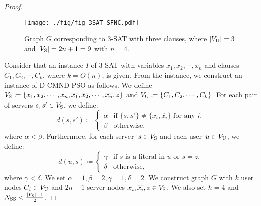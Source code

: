 \documentclass[10pt, letterpaper]{IEEEtran}
\begin{document}
\begin{CJK}{UTF8}{ipxm}
\begin{proof}
  \begin{figure}[!t]
    \begin{center}
      \texttt{[image: ./fig/fig\_3SAT\_SFNC.pdf]}
    \end{center}
    \caption{Graph $G$ corresponding to 3-SAT with three clauses, where $|V_{\rm U}|=3$ and $|V_{\rm S}|=2n+1=9$ with $n=4$.}
    \label{fig:3SAT_SFNC}
  \end{figure}

  Consider that an instance $I$ of 3-SAT with variables $x_1, x_2,\cdots, x_n$ and clauses $C_1, C_2,\cdots, C_k$, where $k=O(n)$, is given.
  From the instance, we construct an instance of D-CMND-PSO as follows.
  We define $V_{\rm{S}} \coloneq \{x_1, x_2,\cdots, x_n, \overline{x_1},\overline{x_2},\cdots,\overline{x_n},z\}$ and $V_{\rm{U}} \coloneq \{C_1,C_2,\cdots,C_k\}$.
  For each pair of servers $s, s'\in V_{\rm{S}}$, we define:
  \begin{equation}
    d(s, s')\coloneqq
    \begin{cases}
      \alpha & \text{if $\{s, s'\}\neq \{x_i,\overline{x_i}\}$ for any $i$,}\\
      \beta& \text{otherwise,}
    \end{cases}
  \end{equation}
  where $\alpha < \beta$. Furthermore, for each server~$s\in V_{\rm{S}}$ and each user~$u\in V_{\rm{U}}$, we define:
  \begin{equation}
    d(u,s)\coloneqq
    \begin{cases}
      \gamma & \text{if $s$ is a literal in $u$ or $s=z$,}\\
      \delta& \text{otherwise,}
    \end{cases}
  \end{equation}
  where $\gamma < \delta$.
  We set $\alpha = 1, \beta = 2, \gamma = 1, \delta = 2$.
  We construct graph $G$ with $k$ user nodes $C_i \in V_{\rm{U}}$ and $2n+1$ server nodes $x_i, \overline{x_i}, z \in V_{\rm{S}}$.
  We also set $h=4$ and $N_{\mathrm{SS}} < \frac{|V_{\rm{S}}|-1}{2}$.


\end{proof}
\end{CJK}
\end{document}
